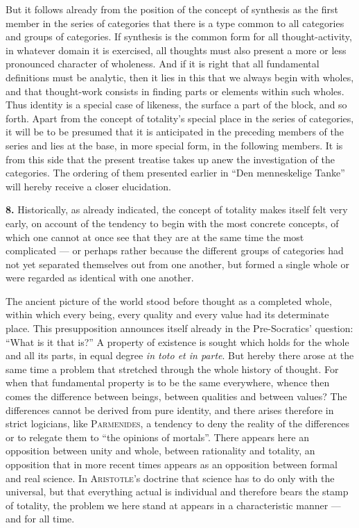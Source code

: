 \documentclass[12pt]{book}
\newcommand{\hnum}[1]{\textbf{#1.}\enspace}
\newcommand{\opage}[1]{\marginnote{\footnotesize\textit{[#1]}}}
\begin{document}
But it follows already from the position of the concept of synthesis as the
first member in the series of categories that there is a type common to all
categories and groups of categories. If synthesis is the common form for all
thought-activity, in whatever domain it is exercised, all thoughts must also
present a more or less \opage{20}pronounced character of wholeness. And if it is right
that all fundamental definitions must be analytic, then it lies in this that we
always begin with wholes, and that thought-work consists in finding parts or
elements within such wholes. Thus identity is a special case of likeness, the
surface a part of the block, and so forth. Apart from the concept of totality's
special place in the series of categories, it will be to be presumed that it is
anticipated in the preceding members of the series and lies at the base, in more
special form, in the following members. It is from this side that the present
treatise takes up anew the investigation of the categories. The ordering of them
presented earlier in ``Den menneskelige Tanke'' will hereby receive a closer
elucidation.

\hnum{8} Historically, as already indicated, the concept of totality makes
itself felt very early, on account of the tendency to begin with the most
concrete concepts, of which one cannot at once see that they are at the same
time the most complicated --- or perhaps rather because the different groups of
categories had not yet separated themselves out from one another, but formed a
single whole or were regarded as identical with one another.

The ancient picture of the world stood before thought as a completed whole,
within which every being, every quality and every value had its determinate
place. This presupposition announces itself already in the Pre-Socratics'
question: ``What is it that is?'' A property of existence is sought which holds
for the whole and all its parts, in equal degree \textit{in toto et in parte}.
But hereby there arose at the same time a problem that stretched through the
whole history of thought. For when that fundamental property is to be the same
everywhere, whence then comes the difference between beings, between qualities
and between values? The differences cannot be derived from pure identity, and
there arises therefore in strict logicians, like \textsc{Parmenides}, a tendency
to deny the reality of the differences or to relegate them to ``the opinions of
mortals''. There appears here an opposition between unity and whole, between
rationality and totality, an opposition that in more recent times appears as an
opposition between formal and real science. In \textsc{Aristotle}'s doctrine
that science has to do only with the universal, but that everything actual is
individual and therefore bears the stamp of totality, the problem we here stand
at appears in a characteristic manner --- and for all time.
\end{document}
